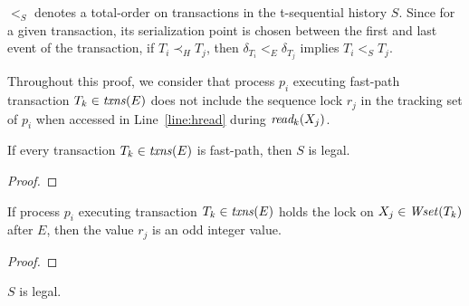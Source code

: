 $<_S$ denotes a total-order on transactions in the t-sequential history $S$.
Since for a given transaction, its
serialization point is chosen between the first and last event of the transaction,
if $T_i \prec_{H} T_j$, then $\delta_{T_i} <_{E} \delta_{T_j}$ implies $T_i <_S T_j$.

Throughout this proof, we consider that process $p_i$ executing fast-path transaction $T_k \in \ms{txns}(E)$
does not include the sequence lock $r_j$ in the tracking set of $p_i$ when accessed in Line~\ref{line:hread}
during $\textit{read}_k(X_j)$.
%
%
\begin{claim}
\label{cl:fast}
If every transaction $T_k \in \ms{txns}(E)$ is fast-path, then $S$ is legal.
\end{claim}
%
\begin{proof}
%
\end{proof}
%
\begin{claim}
\label{cl:alg1claim}
%
If process $p_i$ executing transaction $T_k\in \ms{txns}(E)$ holds the lock on $X_j\in \ms{Wset}(T_k)$ after $E$, then the value $r_j$ is an odd integer value.
\end{claim}
%
\begin{proof}
%
\end{proof}
%
%
\begin{claim}
\label{cl:readfrom}
$S$ is legal.
\end{claim}
%
